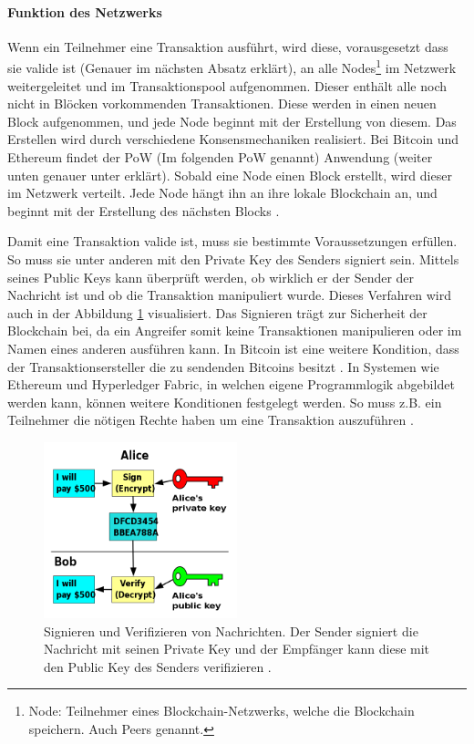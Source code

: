 \paragraph{Funktion des Netzwerks}Wenn ein Teilnehmer eine Transaktion ausführt, wird diese, vorausgesetzt dass sie valide ist (Genauer im nächsten Absatz erklärt), an alle Nodes\footnote{Node: Teilnehmer eines Blockchain-Netzwerks, welche die Blockchain speichern. Auch Peers genannt.} im Netzwerk weitergeleitet und im Transaktionspool aufgenommen. Dieser enthält alle noch nicht in Blöcken vorkommenden Transaktionen. Diese werden in einen neuen Block aufgenommen, und jede Node beginnt mit der Erstellung von diesem. Das Erstellen wird durch verschiedene Konsensmechaniken realisiert. Bei Bitcoin und Ethereum findet der PoW (Im folgenden PoW genannt) Anwendung (weiter unten genauer unter erklärt). Sobald eine Node einen Block erstellt, wird dieser im Netzwerk verteilt. Jede Node hängt ihn an ihre lokale Blockchain an, und beginnt mit der Erstellung des nächsten Blocks \cite{AntonopoulosMasteringbitcoin2015}.

Damit eine Transaktion valide ist, muss sie bestimmte Voraussetzungen erfüllen. So muss sie unter anderen mit den Private Key des Senders signiert sein. Mittels seines Public Keys kann überprüft werden, ob wirklich er der Sender der Nachricht ist und ob die Transaktion manipuliert wurde. Dieses Verfahren wird auch in der Abbildung \ref{fig:key-signing} visualisiert. Das Signieren trägt zur Sicherheit der Blockchain bei, da ein Angreifer somit keine Transaktionen manipulieren oder im Namen eines anderen ausführen kann. In Bitcoin ist eine weitere Kondition, dass der Transaktionsersteller die zu sendenden Bitcoins besitzt \cite{AntonopoulosMasteringbitcoin2015}. In Systemen wie Ethereum und Hyperledger Fabric, in welchen eigene Programmlogik abgebildet werden kann, können weitere Konditionen festgelegt werden. So muss z.B. ein Teilnehmer die nötigen Rechte haben um eine Transaktion auszuführen \cite{HyperledgerComposerTeamAccessControlLanguage}.

\begin{figure}[!htbp]
	\centering
	  \includegraphics[width=0.5\textwidth,angle=0]{images/key-signing}
	  \caption{Signieren und Verifizieren von Nachrichten. Der Sender signiert die Nachricht mit seinen Private Key und der Empfänger kann diese mit den Public Key des Senders verifizieren \cite{WikimediaCommonsPublickeysigning2006}.}
	  \label{fig:key-signing}
\end{figure}
	
